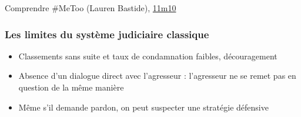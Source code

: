 \documentclass[french]{beamer}
\begin{document}
\begin{frame}
\begin{block}{Comprendre \#MeToo (Lauren Bastide), \href{https://podcasts.musixmatch.com/podcast/01gz0dx010r13t2j6yymscmvrf/episode/01gz0dx010r13t2j6yymscmvrp?time=670.945}{11m10}}
\begin{quote}
    \end{quote}
  \end{block}
\end{frame}

\begin{frame}
  \frametitle{Les limites du système judiciaire classique}
  \begin{itemize}
    \item Classements sans suite et taux de condamnation faibles, découragement
    \item Absence d’un dialogue direct avec l’agresseur : l’agresseur ne se remet pas en question de la même manière
    \item Même s’il demande pardon, on peut suspecter une stratégie défensive
  \end{itemize}
\end{frame}
\end{document}
